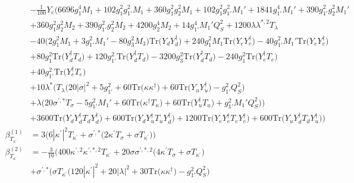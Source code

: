{\begin{align}
 &-\frac{1}{100} Y_e \Big(6696 g_{1}^{4} M_1 +102 g_{1}^{2} g_{1'}^{2} M_1 +360 g_{1}^{2} g_{2}^{2} M_1 +102 g_{1}^{2} g_{1'}^{2} M_1' +1841 g_{1'}^{4} M_1' +390 g_{1'}^{2} g_{2}^{2} M_1' \nonumber \\ 
 &+360 g_{1}^{2} g_{2}^{2} M_2 +390 g_{1'}^{2} g_{2}^{2} M_2 +4200 g_{2}^{4} M_2 +14 g_{1'}^{4} M_1' Q_{S}^{2} +1200 \lambda \lambda^{*,2} T_{\lambda} \nonumber \\ 
 &-40 \Big(2 g_{1}^{2} M_1  + 3 g_{1'}^{2} M_1'  -80 g_{3}^{2} M_3 \Big)\mbox{Tr}\Big({Y_d  Y_{d}^{\dagger}}\Big) +240 g_{1}^{2} M_1 \mbox{Tr}\Big({Y_e  Y_{e}^{\dagger}}\Big) -40 g_{1'}^{2} M_1' \mbox{Tr}\Big({Y_e  Y_{e}^{\dagger}}\Big) \nonumber \\ 
 &+80 g_{1}^{2} \mbox{Tr}\Big({Y_{d}^{\dagger}  T_d}\Big) +120 g_{1'}^{2} \mbox{Tr}\Big({Y_{d}^{\dagger}  T_d}\Big) -3200 g_{3}^{2} \mbox{Tr}\Big({Y_{d}^{\dagger}  T_d}\Big) -240 g_{1}^{2} \mbox{Tr}\Big({Y_{e}^{\dagger}  T_e}\Big) \nonumber \\ 
 &+40 g_{1'}^{2} \mbox{Tr}\Big({Y_{e}^{\dagger}  T_e}\Big) \nonumber \\ 
 &+10 \lambda^* \Big(T_{\lambda} \Big(20 |\sigma|^2  + 5 g_{1'}^{2}  + 60 \mbox{Tr}\Big({\kappa  \kappa^{\dagger}}\Big)  + 60 \mbox{Tr}\Big({Y_u  Y_{u}^{\dagger}}\Big)  - g_{1'}^{2} Q_{S}^{2} \Big)\nonumber \\ 
 &+\lambda \Big(20 \sigma^{\prime,*} T_{\sigma}  -5 g_{1'}^{2} M_1'  + 60 \mbox{Tr}\Big({\kappa^{\dagger}  T_{\kappa}}\Big)  + 60 \mbox{Tr}\Big({Y_{u}^{\dagger}  T_u}\Big)  + g_{1'}^{2} M_1' Q_{S}^{2} \Big)\Big)\nonumber \\ 
 &+3600 \mbox{Tr}\Big({Y_d  Y_{d}^{\dagger}  T_d  Y_{d}^{\dagger}}\Big) +600 \mbox{Tr}\Big({Y_d  Y_{u}^{\dagger}  T_u  Y_{d}^{\dagger}}\Big) +1200 \mbox{Tr}\Big({Y_e  Y_{e}^{\dagger}  T_e  Y_{e}^{\dagger}}\Big) +600 \mbox{Tr}\Big({Y_u  Y_{d}^{\dagger}  T_d  Y_{u}^{\dagger}}\Big) \Big)\\ 
\beta_{T_{\kappa^\prime}}^{(1)} & =  
3 \Big(6 |\kappa^\prime|^2 T_{\kappa^\prime}  + \sigma^{\prime,*} \Big(2 \kappa^\prime T_{\sigma}  + \sigma T_{\kappa^\prime} \Big)\Big)\\ 
\beta_{T_{\kappa^\prime}}^{(2)} & =  
-\frac{3}{10} \Big(400 \kappa^{\prime,2} \kappa^{\prime,*,2} T_{\kappa^\prime} +20 \sigma \sigma^{\prime,*,2} \Big(4 \kappa^\prime T_{\sigma}  + \sigma T_{\kappa^\prime} \Big)\nonumber \\ 
 &+\sigma^{\prime,*} \Big(\sigma T_{\kappa^\prime} \Big(120 |\kappa^\prime|^2  + 20 |\lambda|^2  + 30 \mbox{Tr}\Big({\kappa  \kappa^{\dagger}}\Big)  - g_{1'}^{2} Q_{S}^{2} \Big)\nonumber \\ 

\end{align}}
